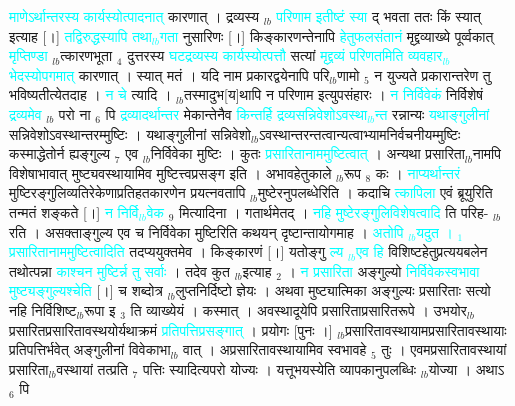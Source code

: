 \documentclass[article,12pt,a4paper]{memoir}%
\newcommand{\quotelemma}[1]{\textcolor{cyan}{#1}}
\begin{document}
\quotelemma{माणेऽर्थान्तरस्य कार्यस्योत्पादनात्} \cite[5b2]{vn-msN} कारणात् । द्रव्यस्य {\tiny $_{lb}$} \leavevmode{} \quotelemma{परिणाम इतीष्टं स्या} \cite[5b2]{vn-msN} द् भवता ततः किं स्यात् इत्याह [।] \quotelemma{तद्विरुद्धस्यापि तथा{\tiny $_{lb}$}गता} नुसारिणः [।] किङ्कारणन्तेनापि \quotelemma{हेतुफलसंतानं} मृद्द्रव्याख्ये पूर्व्वकात् \quotelemma{मृप्तिण्डा} {\tiny $_{lb}$}त्कारणभूता {\tiny $_{4}$} दुत्तरस्य \quotelemma{घटद्रव्यस्य कार्यस्योत्पत्तौ} सत्यां \quotelemma{मृद्द्रव्यं परिणतमिति व्यवहार{\tiny $_{lb}$}भेदस्योपगमात्} \cite[5b3]{vn-msN} कारणात् । स्यात् मतं । यदि नाम प्रकारद्वयेनापि परि{\tiny $_{lb}$}णामो {\tiny $_{5}$} न युज्यते प्रकारान्तरेण तु भविष्यतीत्येतदाह । \quotelemma{न चे} \cite[5b3]{vn-msN} त्यादि । {\tiny $_{lb}$}तस्मादुभ[य]थापि न परिणाम इत्युपसंहारः । \quotelemma{न निर्विवेकं} निर्विशेषं \quotelemma{द्रव्यमेव} {\tiny $_{lb}$} \cite[5b3]{vn-msN} परो ना {\tiny $_{6}$} पि \quotelemma{द्रव्यादर्थान्तर} मेकान्तेनैव \quotelemma{किन्तर्हि द्रव्यसन्निवेशोऽवस्था{\tiny $_{lb}$}न्त} रन्नान्यः \quotelemma{यथाङ्गुलीनां} सन्निवेशोऽवस्थान्तरम्मुष्टिः । यथाङ्गुलीनां सन्निवेशो{\tiny $_{lb}$}ऽवस्थान्तरन्तत्वान्यत्वाभ्यामनिर्वचनीयम्मुष्टिः कस्माद्धेतोर्न ह्यङ्गुल्य {\tiny $_{7}$} एव {\tiny $_{lb}$}निर्विवेका मुष्टिः । कुतः \quotelemma{प्रसारितानाममुष्टित्वात्} \cite[5b4]{vn-msN} । अन्यथा प्रसारिता{\tiny $_{lb}$}नामपि विशेषाभावात् मुष्ट्यवस्थायामिव मुष्टित्त्वप्रसङ्ग इति । अभावहेतुकाले {\tiny $_{lb}$}रूप {\tiny $_{8}$} कः । \quotelemma{नाप्यर्थान्तरं} मुष्टिरङ्गुलिव्यतिरेकेणाप्रतिहतकारणेन प्रयत्नवतापि {\tiny $_{lb}$}मुष्टेरनुपलब्धेरिति । कदाचि \quotelemma{त्कापिला} एवं ब्रूयुरिति तन्मतं शङ्कते [।] \quotelemma{न निर्वि{\tiny $_{lb}$}वेक} {\tiny $_{9}$} \leavevmode{} मित्यादिना । गतार्थमेतद् । \quotelemma{नहि मुष्टेरङ्गुलिविशेषत्वादि} \cite[5b5]{vn-msN} ति परिह- {\tiny $_{lb}$}रति । असक्ताङ्गुल्य एव च निर्विवेका मुष्टिरिति कथयन् दृष्टान्तायोगमाह । \quotelemma{अतोपि {\tiny $_{lb}$}यदुत । {\tiny $_{1}$} प्रसारितानाममुष्टित्वादिति} तदप्ययुक्तमेव । किङ्कारणं [।] यतोङ्गु \quotelemma{ल्य {\tiny $_{lb}$}एव हि} विशिष्टहेतुप्रत्ययबलेन तथोत्पन्ना \quotelemma{काश्चन मुष्टिर्न्न तु सर्वाः} । तदेव कुत {\tiny $_{lb}$}इत्याह {\tiny $_{2}$} । \quotelemma{न प्रसारिता} अङ्गुल्यो \quotelemma{निर्विवेकस्वभावा मुष्ट्यङ्गुल्यश्चेति} [।] च शब्दोत्र {\tiny $_{lb}$}लुप्तनिर्दिष्टो ज्ञेयः । अथवा मुष्ट्यात्मिका अङ्गुल्यः प्रसारिताः सत्यो नहि निर्विशिष्ट{\tiny $_{lb}$}रूपा इ {\tiny $_{3}$} ति व्याख्येयं । कस्मात् । अवस्थादूयेपि प्रसारिताप्रसारितरूपे । उभयोर{\tiny $_{lb}$}प्रसारितप्रसारितावस्थयोर्यथाक्रमं \quotelemma{प्रतिपत्तिप्रसङ्गात्} \cite[5b5]{vn-msN} । प्रयोगः [पुनः ।] {\tiny $_{lb}$}प्रसारितावस्थायामप्रसारितावस्थायाः प्रतिपत्तिर्भवेत् अङ्गुलीनां विवेकाभा{\tiny $_{lb}$} \leavevmode{} वात् । अप्रसारितावस्थायामिव स्वभावहे {\tiny $_{5}$} तुः । एवमप्रसारितावस्थायां प्रसारिता{\tiny $_{lb}$}वस्थायां तत्प्रति {\tiny $_{7}$} पत्तिः स्यादित्यपरो योज्यः । यत्तूभयस्येति व्यापकानुपलब्धिः {\tiny $_{lb}$}योज्या । अथाऽ {\tiny $_{6}$} पि 
\end{document}
